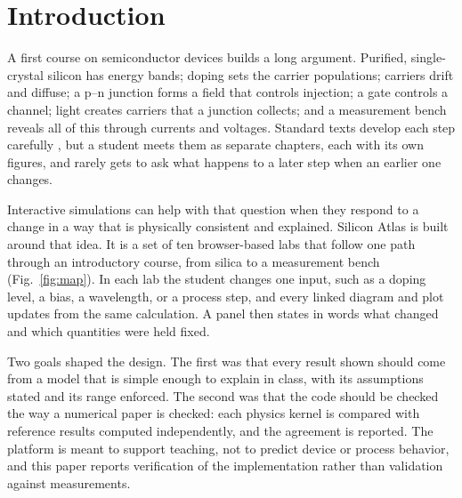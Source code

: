 \documentclass[conference]{IEEEtran}
\begin{document}
\section{Introduction}
A first course on semiconductor devices builds a long argument. Purified, single-crystal silicon has energy bands; doping sets the carrier populations; carriers drift and diffuse; a p--n junction forms a field that controls injection; a gate controls a channel; light creates carriers that a junction collects; and a measurement bench reveals all of this through currents and voltages. Standard texts develop each step carefully \cite{neamen2012,sze2007}, but a student meets them as separate chapters, each with its own figures, and rarely gets to ask what happens to a later step when an earlier one changes.

Interactive simulations can help with that question when they respond to a change in a way that is physically consistent and explained. Silicon Atlas is built around that idea. It is a set of ten browser-based labs that follow one path through an introductory course, from silica to a measurement bench (Fig.~\ref{fig:map}). In each lab the student changes one input, such as a doping level, a bias, a wavelength, or a process step, and every linked diagram and plot updates from the same calculation. A panel then states in words what changed and which quantities were held fixed.

Two goals shaped the design. The first was that every result shown should come from a model that is simple enough to explain in class, with its assumptions stated and its range enforced. The second was that the code should be checked the way a numerical paper is checked: each physics kernel is compared with reference results computed independently, and the agreement is reported. The platform is meant to support teaching, not to predict device or process behavior, and this paper reports verification of the implementation rather than validation against measurements.
\end{document}
